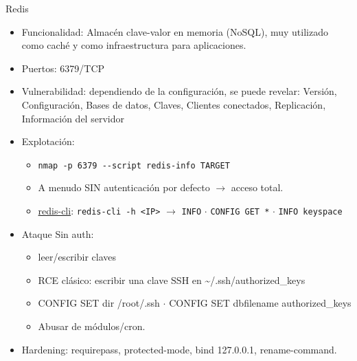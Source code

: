 \documentclass[aspectratio=169,11pt]{beamer}
\newcommand{\cmd}[1]{\texttt{#1}}
\begin{document}

\begin{frame}[allowframebreaks]{Redis}
\small
  \begin{itemize}
  \item Funcionalidad: Almacén clave-valor en memoria (NoSQL), muy utilizado como caché y como infraestructura para aplicaciones.
  \item Puertos: 6379/TCP 
  \item Vulnerabilidad: dependiendo de la configuración, se puede revelar: Versión, Configuración, Bases de datos, Claves, Clientes conectados, Replicación, Información del servidor
  \item Explotación:
    \begin{itemize}
  \item \cmd{nmap -p 6379 -{}-script redis-info TARGET}
  \item A menudo SIN autenticación por defecto $\rightarrow$ acceso total.
  \item \href{https://redis.io/docs/latest/develop/tools/cli/}{redis-cli}: \cmd{redis-cli -h <IP>} $\rightarrow$ \cmd{INFO} $\cdot$ \cmd{CONFIG GET *} $\cdot$ \cmd{INFO keyspace}
      \end{itemize}

  \item Ataque Sin auth: 
    \begin{itemize}
  \item leer/escribir claves
  \item RCE clásico: escribir una clave SSH en \textasciitilde{}/.ssh/authorized\_keys 
  \item CONFIG SET dir /root/.ssh $\cdot$ CONFIG SET dbfilename authorized\_keys
  \item Abusar de módulos/cron.
    \end{itemize}

  \item Hardening: requirepass, protected-mode, bind 127.0.0.1, rename-command.


  \end{itemize}
\end{frame}

\end{document}
